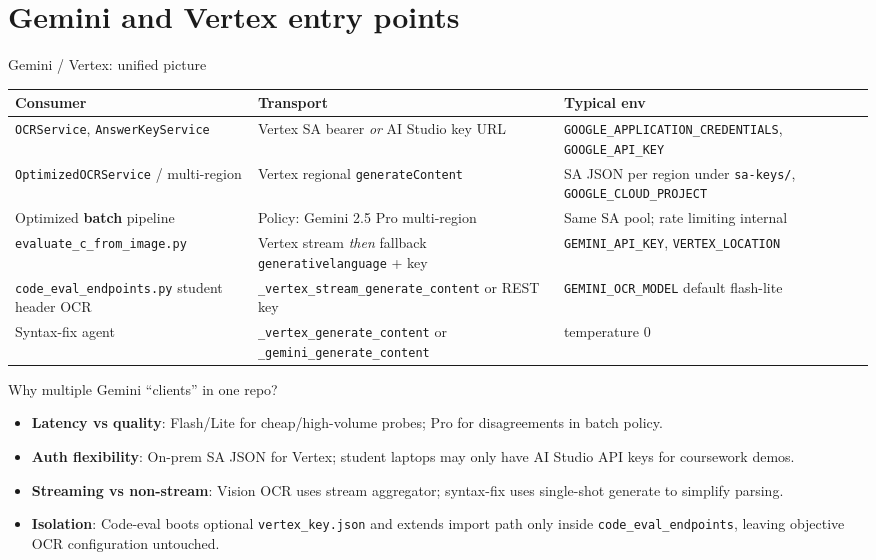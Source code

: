 \documentclass[aspectratio=169]{beamer}
\begin{document}
\section{Gemini and Vertex entry points}

\begin{frame}{Gemini / Vertex: unified picture}
  \footnotesize
  \begin{tabular}{@{}p{3.5cm}p{5.3cm}p{4.8cm}@{}}
    \toprule
    Consumer & Transport & Typical env \\
    \midrule
    \texttt{OCRService}, \texttt{AnswerKeyService} & Vertex SA bearer \emph{or} AI Studio key URL & \texttt{GOOGLE\_APPLICATION\_CREDENTIALS}, \texttt{GOOGLE\_API\_KEY} \\
    \texttt{OptimizedOCRService} / multi-region & Vertex regional \texttt{generateContent} & SA JSON per region under \texttt{sa-keys/}, \texttt{GOOGLE\_CLOUD\_PROJECT} \\
    Optimized \textbf{batch} pipeline & Policy: Gemini 2.5 Pro multi-region & Same SA pool; rate limiting internal \\
    \texttt{evaluate\_c\_from\_image.py} & Vertex stream \emph{then} fallback \texttt{generativelanguage} + key & \texttt{GEMINI\_API\_KEY}, \texttt{VERTEX\_LOCATION} \\
    \texttt{code\_eval\_endpoints.py} student header OCR & \texttt{\_vertex\_stream\_generate\_content} or REST key & \texttt{GEMINI\_OCR\_MODEL} default flash-lite \\
    Syntax-fix agent & \texttt{\_vertex\_generate\_content} or \texttt{\_gemini\_generate\_content} & temperature 0 \\
    \bottomrule
  \end{tabular}
\end{frame}

\begin{frame}{Why multiple Gemini ``clients'' in one repo?}
  \small
  \begin{itemize}
    \item \textbf{Latency vs quality}: Flash/Lite for cheap/high-volume probes; Pro for disagreements in batch policy.
    \item \textbf{Auth flexibility}: On-prem SA JSON for Vertex; student laptops may only have AI Studio API keys for coursework demos.
    \item \textbf{Streaming vs non-stream}: Vision OCR uses stream aggregator; syntax-fix uses single-shot generate to simplify parsing.
    \item \textbf{Isolation}: Code-eval boots optional \texttt{vertex\_key.json} and extends import path only inside \texttt{code\_eval\_endpoints}, leaving objective OCR configuration untouched.
  \end{itemize}
\end{frame}
\end{document}
